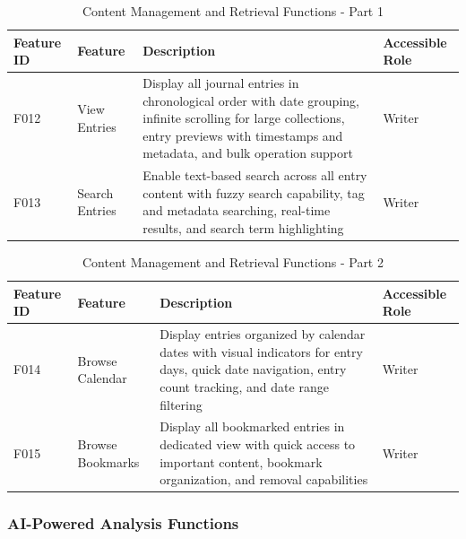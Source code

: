 \begin{table}[H]
\centering
\caption{Content Management and Retrieval Functions - Part 1}
\label{tab:content-management-functions-1}
\begin{tabular}{|p{0.8cm}|p{2.2cm}|p{9.5cm}|p{1.5cm}|}
\hline
\textbf{Feature ID} & \textbf{Feature} & \textbf{Description} & \textbf{Accessible Role} \\
\hline
F012 & View Entries & Display all journal entries in chronological order with date grouping, infinite scrolling for large collections, entry previews with timestamps and metadata, and bulk operation support & Writer \\
\hline
F013 & Search Entries & Enable text-based search across all entry content with fuzzy search capability, tag and metadata searching, real-time results, and search term highlighting & Writer \\
\hline
\end{tabular}
\end{table}

\begin{table}[H]
\centering
\caption{Content Management and Retrieval Functions - Part 2}
\label{tab:content-management-functions-2}
\begin{tabular}{|p{0.8cm}|p{2.2cm}|p{9.5cm}|p{1.5cm}|}
\hline
\textbf{Feature ID} & \textbf{Feature} & \textbf{Description} & \textbf{Accessible Role} \\
\hline
F014 & Browse Calendar & Display entries organized by calendar dates with visual indicators for entry days, quick date navigation, entry count tracking, and date range filtering & Writer \\
\hline
F015 & Browse Bookmarks & Display all bookmarked entries in dedicated view with quick access to important content, bookmark organization, and removal capabilities & Writer \\
\hline
\end{tabular}
\end{table}

\newpage

\subsubsection{AI-Powered Analysis Functions}

